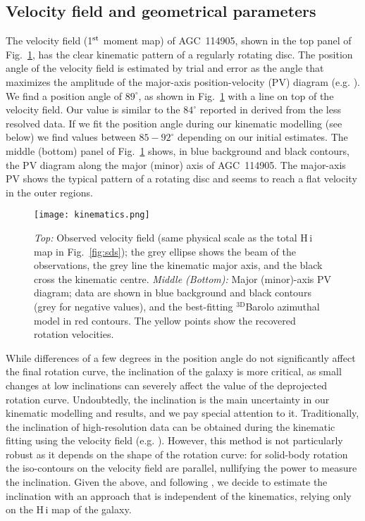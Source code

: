 \documentclass[fleqn,usenatbib]{mnras}
\begin{document}
\subsection{Velocity field and geometrical parameters}
\label{sec:inclination}
The velocity field (1$^{\rm st}$ moment map) of AGC~114905, shown in the top panel of Fig.~\ref{fig:kinematics}, has the clear kinematic pattern of a regularly rotating disc. The position angle of the velocity field is estimated by trial and error as the angle that maximizes the amplitude of the major-axis position-velocity (PV) diagram (e.g. \citealt{huds2020}). We find a position angle of $89^\circ$, as shown in Fig.~\ref{fig:kinematics} with a line on top of the velocity field. Our value is similar to the $84^\circ$ reported in \citet{huds2019,huds2020} derived from the less resolved data. If we fit the position angle during our kinematic modelling (see below) we find values between $85-92^\circ$ depending on our initial estimates. The middle (bottom) panel of Fig.~\ref{fig:kinematics} shows, in blue background and black contours, the PV diagram along the major (minor) axis of AGC~114905. The major-axis PV shows the typical pattern of a rotating disc and seems to reach a flat velocity in the outer regions. 

 \begin{figure}
     \centering
     \texttt{[image: kinematics.png]}
     \caption{\textit{Top:} Observed velocity field (same physical scale as the total H\,{\sc i} map in Fig.~\ref{fig:sds}); the grey ellipse shows the beam of the observations, the grey line the kinematic major axis, and the black cross the kinematic centre. \textit{Middle (Bottom):} Major (minor)-axis PV diagram; data are shown in blue background and black contours (grey for negative values), and the best-fitting $\mathrm{^{3D}}$Barolo azimuthal model in red contours. The yellow points show the recovered rotation velocities.}
     \label{fig:kinematics}
 \end{figure}

While differences of a few degrees in the position angle do not significantly affect the final rotation curve, the inclination of the galaxy is more critical, as small changes at low inclinations can severely affect the value of the deprojected rotation curve. Undoubtedly, the inclination is the main uncertainty in our kinematic modelling and results, and we pay special attention to it. 
Traditionally, the inclination of high-resolution data can be obtained during the kinematic fitting using the velocity field (e.g. \citealt{deblok08}). However, this method is not particularly robust as it depends on the shape of the rotation curve: for solid-body rotation the iso-contours on the velocity field are parallel, nullifying the power to measure the inclination. Given the above, and following \citet{huds2020}, we decide to estimate the inclination with an approach that is independent of the kinematics, relying only on the H\,{\sc i} map of the galaxy.
\end{document}
